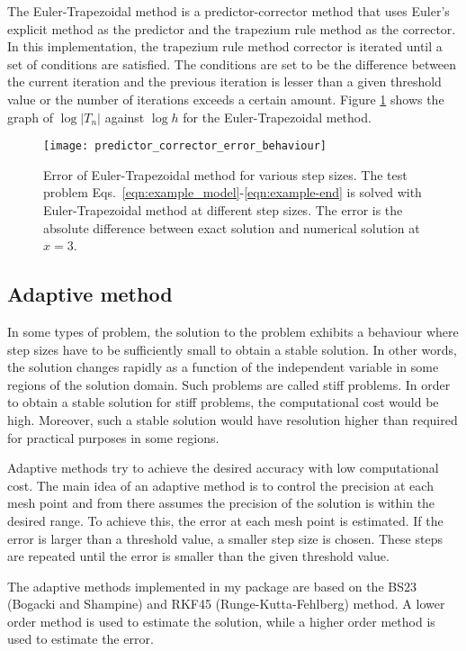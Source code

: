 The Euler-Trapezoidal method is a predictor-corrector method that uses Euler's explicit method as the predictor and the trapezium rule method as the corrector. In this implementation, the trapezium rule method corrector is iterated until a set of conditions are satisfied. The conditions are set to be the difference between the current iteration and the previous iteration is lesser than a given threshold value or the number of iterations exceeds a certain amount. Figure \ref{fig:predictor_corrector_error_behaviour} shows the graph of $\log |T_n|$ against $\log h$ for the Euler-Trapezoidal method.

\begin{figure}
    \texttt{[image: predictor\_corrector\_error\_behaviour]}
    \caption{Error of Euler-Trapezoidal method for various step sizes. The test problem Eqs.~\eqref{eqn:example_model}-\eqref{eqn:example-end} is solved with Euler-Trapezoidal method at different step sizes. The error is the absolute difference between exact solution and numerical solution at $x=3$.}
    \label{fig:predictor_corrector_error_behaviour}
\end{figure}

\subsection{Adaptive method}
\label{sec:adaptive-method}
In some types of problem, the solution to the problem exhibits a behaviour where step sizes have to be sufficiently small to obtain a stable solution. In other words, the solution changes rapidly as a function of the independent variable in some regions of the solution domain. Such problems are called stiff problems. In order to obtain a stable solution for stiff problems, the computational cost would be high. Moreover, such a stable solution would have resolution higher than required for practical purposes in some regions.

Adaptive methods try to achieve the desired accuracy with low computational cost. The main idea of an adaptive method is to control the precision at each mesh point and from there assumes the precision of the solution is within the desired range. To achieve this, the error at each mesh point is estimated. If the error is larger than a threshold value, a smaller step size is chosen. These steps are repeated until the error is smaller than the given threshold value.

The adaptive methods implemented in my package are based on the BS23 (Bogacki and Shampine) and RKF45 (Runge-Kutta-Fehlberg) method. A lower order method is used to estimate the solution, while a higher order method is used to estimate the error. 

